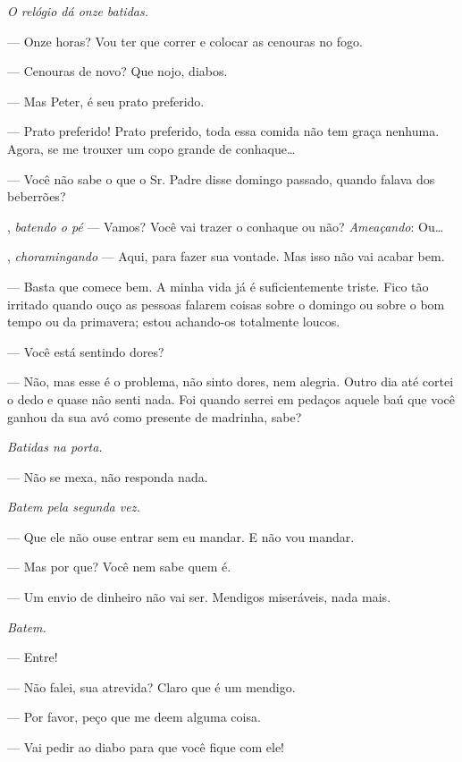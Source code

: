 \begin{myparindent}{0pt}
\begin{Parskip}
\emph{O relógio dá onze batidas.}

 --- Onze horas? Vou ter que correr e colocar as cenouras no fogo.

 --- Cenouras de novo? Que nojo, diabos.

 --- Mas Peter, é seu prato preferido.

 --- Prato preferido! Prato preferido, toda essa comida não tem
graça nenhuma. Agora, se me trouxer um copo grande de conhaque\ldots{}

 --- Você não sabe o que o Sr. Padre disse domingo passado, quando
falava dos beberrões?

, \emph{batendo o pé} --- Vamos? Você vai trazer o conhaque ou não?
\emph{Ameaçando}: Ou\ldots{}

, \emph{choramingando} --- Aqui, para fazer sua vontade. Mas isso
não vai acabar bem.

 --- Basta que comece bem. A minha vida já é suficientemente triste.
Fico tão irritado quando ouço as pessoas falarem coisas sobre o domingo
ou sobre o bom tempo ou da primavera; estou achando-os totalmente
loucos.

 --- Você está sentindo dores?

 --- Não, mas esse é o problema, não sinto dores, nem alegria. Outro
dia até cortei o dedo e quase não senti nada. Foi quando serrei em
pedaços aquele baú que você ganhou da sua avó como presente de madrinha,
sabe?

\emph{Batidas na porta.}

 --- Não se mexa, não responda nada.

\emph{Batem pela segunda vez.}

 --- Que ele não ouse entrar sem eu mandar. E não vou mandar.

 --- Mas por que? Você nem sabe quem é.

 --- Um envio de dinheiro não vai ser. Mendigos miseráveis, nada
mais.

\emph{Batem.}

 --- Entre!

 --- Não falei, sua atrevida? Claro que é um mendigo.

 --- Por favor, peço que me deem alguma coisa.

 --- Vai pedir ao diabo para que você fique com ele!


\end{Parskip}
\end{myparindent}
